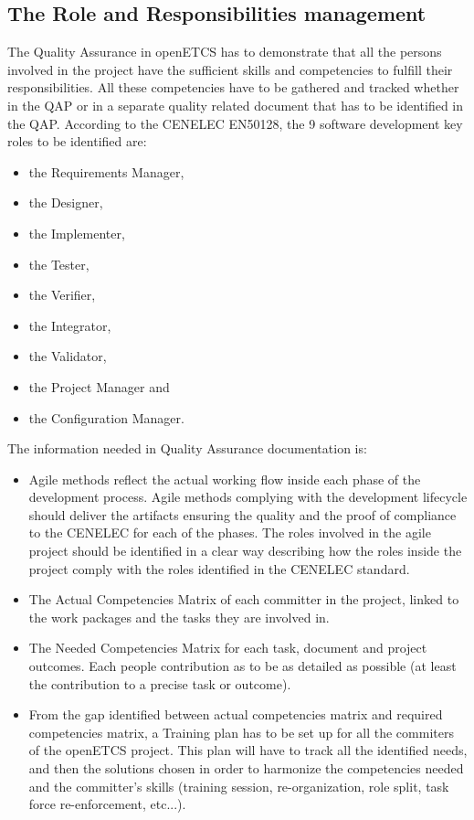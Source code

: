 \documentclass[openetcs]{template/openetcs_article}
\begin{document}
\subsection{The Role and Responsibilities management}
The Quality Assurance in openETCS has to demonstrate that all the persons involved in the project have the sufficient skills and competencies to fulfill their
responsibilities. All these competencies have to be gathered and tracked whether in the QAP or in a separate quality related document that has to be identified
in the QAP.
According to the CENELEC EN50128, the 9 software development key roles to be identified are:
\begin{itemize}
\item the Requirements Manager,
\item the Designer,
\item the Implementer,
\item the Tester,
\item the Verifier,
\item the Integrator,
\item the Validator,
\item the Project Manager and
\item the Configuration Manager.
\end{itemize}

The information needed in Quality Assurance documentation is:
\begin{itemize}
\item Agile methods reflect the actual working flow inside each phase of the development process. Agile methods complying with the development lifecycle should deliver the artifacts ensuring the quality and the proof of compliance to the CENELEC for each of the phases. The roles involved in the agile project should be identified in a clear way describing how the roles inside the project comply with the roles identified in the CENELEC standard.
\item The Actual Competencies Matrix of each committer in the project, linked to the work packages and the tasks they are involved in.
\item The Needed Competencies Matrix for each task, document and project outcomes. Each people contribution as to be as detailed as possible (at least the
contribution to a precise task or outcome).
\item From the gap identified between actual competencies matrix and required competencies matrix, a Training plan has to be set up for all the commiters of the
openETCS project. This plan will have to track all the identified needs, and then the solutions chosen in order to harmonize the competencies needed and the
committer's skills (training session, re-organization, role split, task force re-enforcement, etc...).
\end{itemize}
\end{document}
